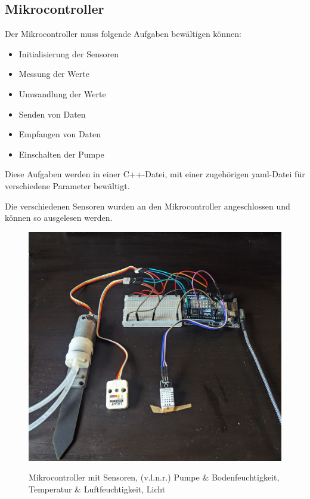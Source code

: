 \subsection{Mikrocontroller}
Der Mikrocontroller muss folgende Aufgaben bewältigen können:
\begin{itemize}
    \item Initialisierung der Sensoren
    \item Messung der Werte
    \item Umwandlung der Werte
    \item Senden von Daten
    \item Empfangen von Daten
    \item Einschalten der Pumpe
\end{itemize}

Diese Aufgaben werden in einer C++-Datei, mit einer zugehörigen yaml-Datei für verschiedene Parameter bewältigt.

Die verschiedenen Sensoren wurden an den Mikrocontroller angeschlossen und können so ausgelesen werden.

\begin{figure}[H]
\centering
\includegraphics[width=\textwidth]{images/microcontroller.jpg}
\caption{Mikrocontroller mit Sensoren, (v.l.n.r.) Pumpe & Bodenfeuchtigkeit, Temperatur & Luftfeuchtigkeit, Licht}\cite{rainpoint_smart_timer}
\label{fig:rainpointDiagram}
\end{figure}

